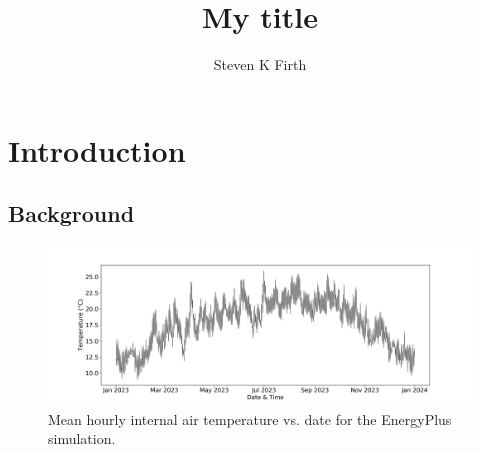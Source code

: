 \documentclass[preprint,review,12pt]{elsarticle}
\begin{document}
	
	\title{My title}
	
	\author[1]{Steven K Firth}
	
	
	\section{Introduction}
	\label{introduction}
	
	\subsection{Background}
	
	\begin{figure}[h!]
		
		\centering
		\includegraphics[width=1\textwidth]{../3_Analysis/Figure1.png}
		\caption{Mean hourly internal air temperature vs. date for the EnergyPlus simulation.}
		\label{fig:1}
		
	\end{figure}
	
\end{document}
